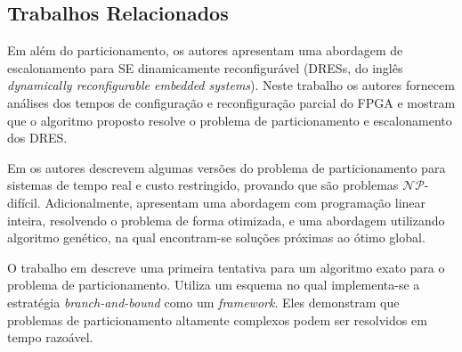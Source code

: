 \subsection{Trabalhos Relacionados}  \label{chap:relacionados}
    
    Em \cite{Mei2000} além do particionamento, os autores apresentam uma abordagem de escalonamento para SE dinamicamente reconfigurável (DRESs, do inglês \textit{dynamically reconfigurable embedded systems}). %
    Neste trabalho os autores fornecem análises dos tempos de configuração e reconfiguração parcial do FPGA e mostram que o algoritmo proposto resolve o problema de particionamento e escalonamento dos DRES.
    
    Em \cite{Arato2003} os autores descrevem algumas versões do problema de particionamento para sistemas de tempo real e custo restringido, provando que são problemas $ \mathcal{NP} $-difícil.
    Adicionalmente, apresentam uma abordagem com programação linear inteira, resolvendo o problema de forma otimizada, e uma abordagem utilizando algoritmo genético, na qual encontram-se soluções próximas ao ótimo global.
    
    O trabalho em \cite{Mann2007} descreve uma primeira tentativa para um algoritmo exato para o problema de particionamento.
    Utiliza um esquema no qual implementa-se a estratégia \textit{branch-and-bound} como um \textit{framework}.
    Eles demonstram que problemas de particionamento altamente complexos podem ser resolvidos em tempo razoável.
    
